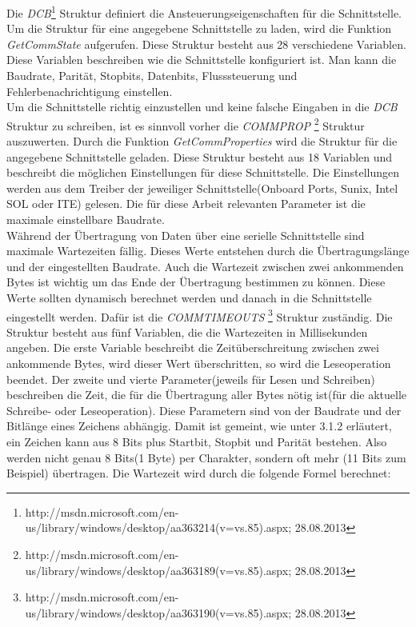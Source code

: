 Die \textit{DCB}\footnote{http://msdn.microsoft.com/en-us/library/windows/desktop/aa363214(v=vs.85).aspx; 28.08.2013} Struktur definiert die Ansteuerungseigenschaften für die Schnittstelle. Um die Struktur für eine angegebene Schnittstelle zu laden, wird die Funktion \textit{GetCommState} aufgerufen. Diese Struktur besteht aus 28 verschiedene Variablen. Diese Variablen beschreiben wie die Schnittstelle konfiguriert ist. Man kann die Baudrate, Parität, Stopbits, Datenbits, Flusssteuerung und Fehlerbenachrichtigung einstellen.
\\

Um die Schnittstelle richtig einzustellen und keine falsche Eingaben in die \textit{DCB} Struktur zu schreiben, ist es sinnvoll vorher die \textit{COMMPROP} \footnote{http://msdn.microsoft.com/en-us/library/windows/desktop/aa363189(v=vs.85).aspx; 28.08.2013} Struktur auszuwerten. Durch die Funktion \textit{GetCommProperties} wird die Struktur für die angegebene Schnittstelle geladen. Diese Struktur besteht aus 18 Variablen und beschreibt die möglichen Einstellungen für diese Schnittstelle. Die Einstellungen werden aus dem Treiber der jeweiliger Schnittstelle(Onboard Ports, Sunix, Intel SOL oder ITE) gelesen. Die für diese Arbeit relevanten Parameter ist die maximale einstellbare Baudrate.
\\

Während der Übertragung von Daten über eine serielle Schnittstelle sind maximale Wartezeiten fällig. Dieses Werte entstehen durch die Übertragungslänge und der eingestellten Baudrate. Auch die Wartezeit zwischen zwei ankommenden Bytes ist wichtig um das Ende der Übertragung bestimmen zu können. Diese Werte sollten dynamisch berechnet werden und danach in die Schnittstelle eingestellt werden. Dafür ist die \textit{COMMTIMEOUTS} \footnote{http://msdn.microsoft.com/en-us/library/windows/desktop/aa363190(v=vs.85).aspx; 28.08.2013} Struktur zuständig. Die Struktur besteht aus fünf Variablen, die die Wartezeiten in Millisekunden angeben. Die erste Variable beschreibt die Zeitüberschreitung zwischen zwei ankommende Bytes, wird dieser Wert überschritten, so wird die Leseoperation beendet. Der zweite und vierte Parameter(jeweils für Lesen und Schreiben) beschreiben die Zeit, die für die Übertragung aller Bytes nötig ist(für die aktuelle Schreibe- oder Leseoperation). Diese Parametern sind von der Baudrate und der Bitlänge eines Zeichens abhängig. Damit ist gemeint, wie unter 3.1.2 erläutert, ein Zeichen kann aus 8 Bits plus Startbit, Stopbit und Parität bestehen. Also werden nicht genau 8 Bits(1 Byte) per Charakter, sondern oft mehr (11 Bits zum Beispiel) übertragen. Die Wartezeit wird durch die folgende Formel berechnet:

